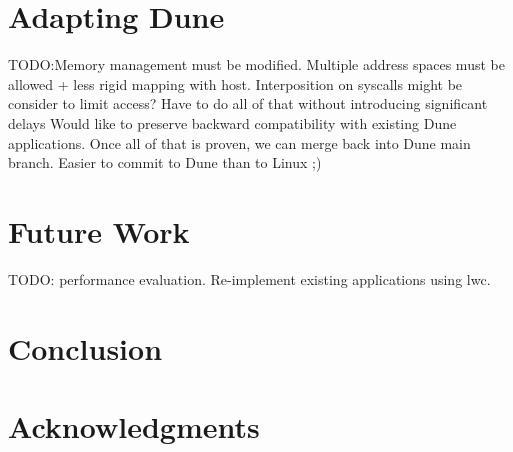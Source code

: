 \documentclass[letterpaper,twocolumn,10pt]{article}
\begin{document}
\section{Adapting Dune}
TODO:Memory management must be modified.
Multiple address spaces must be allowed + less rigid mapping with host.
Interposition on syscalls might be consider to limit access?
Have to do all of that without introducing significant delays
Would like to preserve backward compatibility with existing Dune applications.
Once all of that is proven, we can merge back into Dune main branch.
Easier to commit to Dune than to Linux ;) 

\section{Future Work}
TODO: performance evaluation.
Re-implement existing applications using lwc.

\section{Conclusion}

\section{Acknowledgments}
%
%
%
%
%
%
%
%
{\footnotesize 
}


\theendnotes
\end{document}
